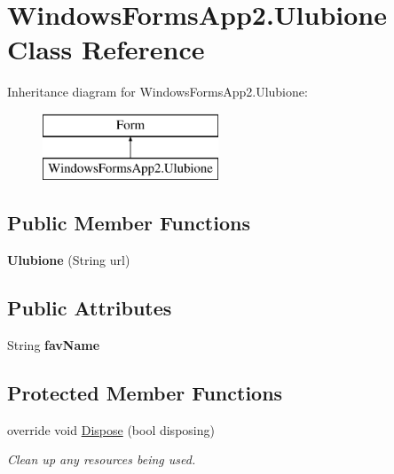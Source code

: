 \hypertarget{class_windows_forms_app2_1_1_ulubione}{}\section{Windows\+Forms\+App2.\+Ulubione Class Reference}
\label{class_windows_forms_app2_1_1_ulubione}
Inheritance diagram for Windows\+Forms\+App2.\+Ulubione\+:\begin{figure}[H]
\begin{center}
\leavevmode
\includegraphics[height=2.000000cm]{class_windows_forms_app2_1_1_ulubione}
\end{center}
\end{figure}
\subsection*{Public Member Functions}
\begin{DoxyCompactItemize}
\item 
\mbox{\label{class_windows_forms_app2_1_1_ulubione_a96147b868bb18d06532d4ccda7e61983}} 
{\bfseries Ulubione} (String url)
\end{DoxyCompactItemize}
\subsection*{Public Attributes}
\begin{DoxyCompactItemize}
\item 
\mbox{\label{class_windows_forms_app2_1_1_ulubione_a164751d342358e85dc72a22ae90ecc17}} 
String {\bfseries fav\+Name}
\end{DoxyCompactItemize}
\subsection*{Protected Member Functions}
\begin{DoxyCompactItemize}
\item 
override void \hyperlink{class_windows_forms_app2_1_1_ulubione_a114b27b249c5a38d47009008fbba7ecb}{Dispose} (bool disposing)
\begin{DoxyCompactList}\small\item\em Clean up any resources being used. \end{DoxyCompactList}\end{DoxyCompactItemize}
